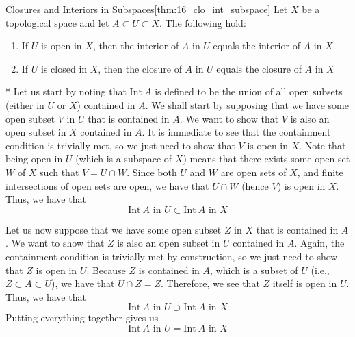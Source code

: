 \begin{thmBox}{Closures and Interiors in Subspaces}[thm:16_clo_int_subspace]
    Let \( X \) be a topological space and let \( A \subset U \subset X \).
    The following hold:
    \begin{enumerate}[label = (\alph*)]
        \item If \( U \) is open in \( X \), then the interior of \( A \) in 
            \( U \) equals the interior of \( A \) in \( X \).
        \item If \( U \) is closed in \( X \), then the closure of \( A \) in 
            \( U \) equals the closure of \( A \) in \( X \)
    \end{enumerate}

    \baseRule

    \begin{proofBox}*
        Let us start by noting that \( \mathrm{Int} \ A \) is defined to be the 
        union of all open subsets (either in \( U \) or \( X \)) contained in 
        \( A \). 
        We shall start by supposing that we have some open subset \( V \) in 
        \( U \) that is contained in \( A \).
        We want to show that \( V \) is also an open subset in \( X \) contained
        in \( A \). 
        It is immediate to see that the containment condition is trivially met,
        so we just need to show that \( V \) is open in \( X \).
        Note that being open in \( U \) (which is a subspace of \( X \)) means 
        that there exists some open set \( W \) of \( X \) such that 
        \( V = U \cap W \).
        Since both \( U \) and \( W \) are open sets of \( X \), and finite 
        intersections of open sets are open, we have that \( U \cap W \) (hence 
        \( V \)) is open in \( X \).
        Thus, we have that 
        \begin{equation*}
            \mathrm{Int} \ A \text{ in } U
            \subset 
            \mathrm{Int} \ A \text{ in } X
        \end{equation*}

        \baseSkip

        Let us now suppose that we have some open subset \( Z \) in \( X \) 
        that is contained in \( A \).
        We want to show that \( Z \) is also an open subset in \( U \) 
        contained in \( A \).
        Again, the containment condition is trivially met by construction, so 
        we just need to show that \( Z \) is open in \( U \).
        Because \( Z \) is contained in \( A \), which is a subset of \( U \) 
        (i.e., \( Z \subset A \subset U \)), we have that \( U \cap Z = Z \).
        Therefore, we see that \( Z \) itself is open in \( U \).
        Thus, we have that 
        \begin{equation*}
            \mathrm{Int} \ A \text{ in } U
            \supset 
            \mathrm{Int} \ A \text{ in } X
        \end{equation*}
        Putting everything together gives us
        \begin{equation*}
            \mathrm{Int} \ A \text{ in } U
            =
            \mathrm{Int} \ A \text{ in } X
        \end{equation*}


\end{proofBox}
\end{thmBox}
